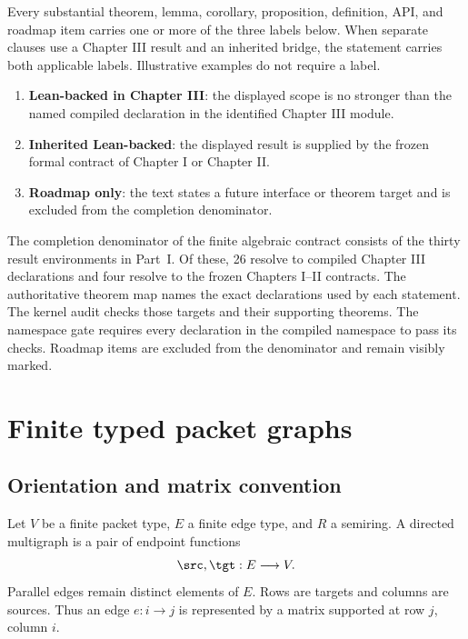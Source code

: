 Every substantial theorem, lemma, corollary, proposition, definition, API,
and roadmap item carries one or more of the three labels below. When separate
clauses use a Chapter III result and an inherited bridge, the statement carries
both applicable labels. Illustrative examples do not require a label.
\begin{enumerate}[label=\textbf{S\arabic*.},leftmargin=3.2em]
\item \textbf{Lean-backed in Chapter III}: the displayed scope is no stronger
than the named compiled declaration in the identified Chapter III module.
\item \textbf{Inherited Lean-backed}: the displayed result is supplied by the
frozen formal contract of Chapter I or Chapter II.
\item \textbf{Roadmap only}: the text states a future interface or theorem
target and is excluded from the completion denominator.
\end{enumerate}

\begin{boundary}
The completion denominator of the finite algebraic contract consists of the
thirty result environments in Part~I. Of these, 26 resolve to compiled
Chapter III declarations and four resolve to the frozen Chapters I--II
contracts. The authoritative theorem map names the exact declarations used
by each statement. The kernel audit checks those targets and their supporting
theorems. The namespace gate requires every declaration in the compiled
 namespace to pass its checks. Roadmap items are
excluded from the denominator and remain visibly marked.
\end{boundary}

\section{Finite typed packet graphs}
\label{sec:edge-operators}

\subsection{Orientation and matrix convention}

Let $V$ be a finite packet type, $E$ a finite edge type, and $R$ a semiring.
A directed multigraph is a pair of endpoint functions
\[
  \src,\tgt:E\longrightarrow V.
\]
Parallel edges remain distinct elements of $E$.  Rows are targets and columns
are sources.  Thus an edge $e:i\to j$ is represented by a matrix supported at
row $j$, column $i$.

